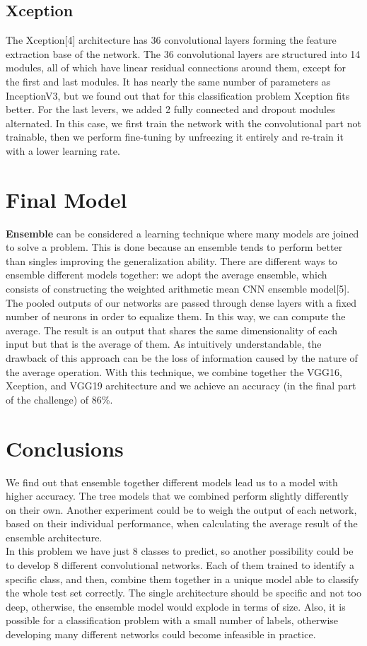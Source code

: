 \documentclass[11pt, oneside]{article}
\begin{document}
\subsection{Xception}
The Xception[4] architecture has 36 convolutional layers forming the feature extraction base of the network. The 36 convolutional layers are structured into 14 modules, all of which have linear residual connections around them, except for the first and last modules. It has nearly the same number of parameters as InceptionV3, but we found out that for this classification problem Xception fits better. For the last levers, we added 2 fully connected and dropout modules alternated. In this case, we first train the network with the convolutional part not trainable, then we perform fine-tuning by unfreezing it entirely and re-train it with a lower learning rate.
\section{Final Model}
\textbf{Ensemble} can be considered a learning technique where many models are joined to solve a problem. This is done because an ensemble tends to perform better than singles improving the generalization ability. There are different ways to ensemble different models together: we adopt the average ensemble, which consists of constructing the weighted arithmetic mean CNN ensemble model[5]. The pooled outputs of our networks are passed through dense layers with a fixed number of neurons in order to equalize them. In this way, we can compute the average. The result is an output that shares the same dimensionality of each input but that is the average of them. As intuitively understandable, the drawback of this approach can be the loss of information caused by the nature of the average operation. With this technique, we combine together the VGG16, Xception, and VGG19 architecture and we achieve an accuracy (in the final part of the challenge) of 86\%.
\section{Conclusions}
We find out that ensemble together different models lead us to a model with higher accuracy. The tree models that we combined perform slightly differently on their own. Another experiment could be to weigh the output of each network, based on their individual performance, when calculating the average result of the ensemble architecture.\\
In this problem we have just 8 classes to predict, so another possibility could be to develop 8 different convolutional networks. Each of them trained to identify a specific class, and then, combine them together in a unique model able to classify the whole test set correctly. The single architecture should be specific and not too deep, otherwise, the ensemble model would explode in terms of size. Also, it is possible for a classification problem with a small number of labels, otherwise developing many different networks could become infeasible in practice.
\end{document}
